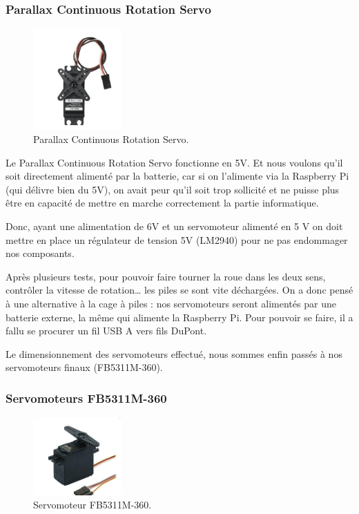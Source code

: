 \documentclass[a4paper,12pt]{report}  %
\begin{document}
\subsubsection{Parallax Continuous Rotation Servo}

\begin{figure}[H]
	\centering
	\includegraphics[width=0.3\textwidth]{./attachments/moteur_rotation.jpg}
	\caption{Parallax Continuous Rotation Servo.}
	
\end{figure}

Le Parallax Continuous Rotation Servo fonctionne en 5V. Et nous voulons qu’il soit directement alimenté par la batterie, car si on l'alimente via la Raspberry Pi (qui délivre bien du 5V), on avait peur qu’il soit trop sollicité et ne puisse plus être en capacité de mettre en marche correctement la partie informatique.

Donc, ayant une alimentation de 6V et un servomoteur alimenté en 5 V on doit mettre en place un régulateur de tension 5V (LM2940) pour ne pas endommager nos composants.

Après plusieurs tests, pour pouvoir faire tourner la roue dans les deux sens, contrôler la vitesse de rotation… les piles se sont vite déchargées. On a donc pensé à une alternative à la cage à piles : nos servomoteurs seront alimentés par une batterie externe, la même qui alimente la Raspberry Pi. Pour pouvoir se faire, il a fallu se procurer un fil USB A vers fils DuPont.

Le dimensionnement des servomoteurs effectué, nous sommes enfin passés à nos servomoteurs finaux (FB5311M-360). \\

\subsubsection{Servomoteurs FB5311M-360}
\begin{figure}[H]
	\centering
	\includegraphics[width=0.3\textwidth]{./attachments/moteur_servo.jpg}
	\caption{Servomoteur FB5311M-360.}
\end{figure}
\end{document}
